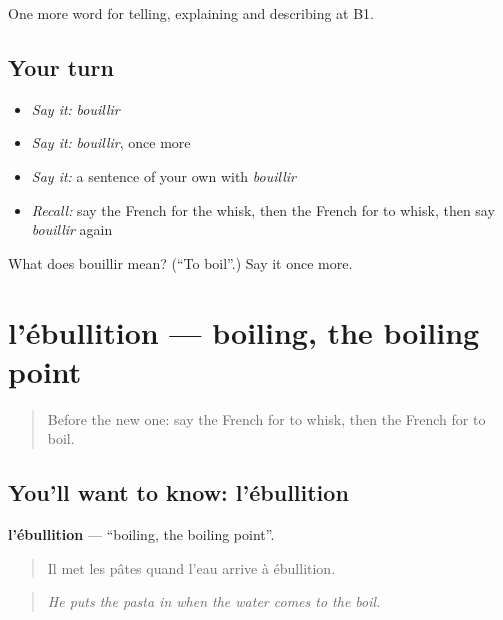 \begin{grammarlens}[title={What you've built}]
One more word for telling, explaining and describing at B1.
\end{grammarlens}

\subsection*{Your turn}
\begin{itemize}
\raggedright
  \item \emph{Say it:} \emph{bouillir}
  \item \emph{Say it:} \emph{bouillir}, once more
  \item \emph{Say it:} a sentence of your own with \emph{bouillir}
  \item \emph{Recall:} say the French for the whisk, then the French for to whisk, then say \emph{bouillir} again
\end{itemize}

\begin{tcolorbox}[breakable,colback=teal!4,colframe=teal!35!black,title={Before you move on}]
What does bouillir mean? (\textquotedblleft{}To boil\textquotedblright{}.) Say it once more.
\end{tcolorbox}
\section[l'ébullition]{l'ébullition — boiling, the boiling point}

\label{lesson:FR-C330-ebullition}



\begin{quote}
Before the new one: say the French for to whisk, then the French for to boil.
\end{quote}

\subsection*{You'll want to know: l'ébullition}
\textbf{l'ébullition} — \textquotedblleft{}boiling, the boiling point\textquotedblright{}.

\begin{quote}
Il met les pâtes quand l'eau arrive à ébullition.
\end{quote}

\begin{quote}
\emph{He puts the pasta in when the water comes to the boil.}
\end{quote}

